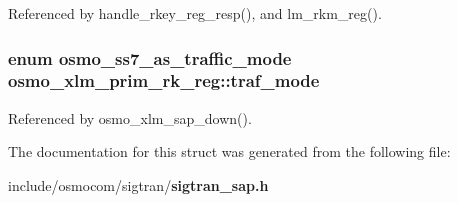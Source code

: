Referenced by handle\+\_\+rkey\+\_\+reg\+\_\+resp(), and lm\+\_\+rkm\+\_\+reg().

\subsubsection[{traf\+\_\+mode}]{\setlength{\rightskip}{0pt plus 5cm}enum {\bf osmo\+\_\+ss7\+\_\+as\+\_\+traffic\+\_\+mode} osmo\+\_\+xlm\+\_\+prim\+\_\+rk\+\_\+reg\+::traf\+\_\+mode}\label{structosmo__xlm__prim__rk__reg_aee54c39203d3dfe5887c1dd0189b26c4}


Referenced by osmo\+\_\+xlm\+\_\+sap\+\_\+down().



The documentation for this struct was generated from the following file\+:\begin{DoxyCompactItemize}
\item 
include/osmocom/sigtran/{\bf sigtran\+\_\+sap.\+h}\end{DoxyCompactItemize}
